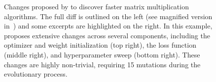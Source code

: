 \begin{figure}[p]
\begin{minipage}{0.32\textwidth}
\end{minipage}
\hspace{0.06\textwidth}
\begin{minipage}{0.59\textwidth}%

\vspace{-0.4em}

\vspace{-0.4em}

\end{minipage}
\hspace{-0.1\textwidth}
\caption{Changes proposed by \method to discover faster matrix multiplication algorithms. The full diff is outlined on the left (see magnified version in~) and some excerpts are highlighted on the right. In this example, \method proposes extensive changes across several components, including the optimizer and weight initialization (top right), the loss function (middle right), and hyperparameter sweep (bottom right). These changes are highly non-trivial, requiring 15 mutations during the evolutionary process.}\label{fig:relaxed-opt-diff}
\centering
\end{figure}
